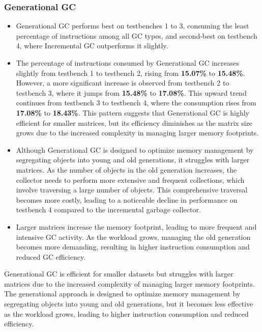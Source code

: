 \documentclass[10pt]{article}
\begin{document}
\subsubsection{Generational GC}
\begin{itemize}
  \item Generational GC performs best on testbenches 1 to 3, consuming the least percentage of instructions among all GC types, and second-best on testbench 4, where Incremental GC outperforms it slightly.
  
  \item The percentage of instructions consumed by Generational GC increases slightly from testbench 1 to testbench 2, rising from \textbf{15.07\%} to \textbf{15.48\%}. However, a more significant increase is observed from testbench 2 to testbench 3, where it jumps from \textbf{15.48\%} to \textbf{17.08\%}. This upward trend continues from testbench 3 to testbench 4, where the consumption rises from \textbf{17.08\%} to \textbf{18.43\%}. This pattern suggests that Generational GC is highly efficient for smaller matrices, but its efficiency diminishes as the matrix size grows due to the increased complexity in managing larger memory footprints.

  \item Although Generational GC is designed to optimize memory management by segregating objects into young and old generations, it struggles with larger matrices. As the number of objects in the old generation increases, the collector needs to perform more extensive and frequent collections, which involve traversing a large number of objects. This comprehensive traversal becomes more costly, leading to a noticeable decline in performance on testbench 4 compared to the incremental garbage collector.

  \item Larger matrices increase the memory footprint, leading to more frequent and intensive GC activity. As the workload grows, managing the old generation becomes more demanding, resulting in higher instruction consumption and reduced GC efficiency.
\end{itemize}
Generational GC is efficient for smaller datasets but struggles with larger matrices due to the increased complexity of managing larger memory footprints. The generational approach is designed to optimize memory management by segregating objects into young and old generations, but it becomes less effective as the workload grows, leading to higher instruction consumption and reduced efficiency.
\end{document}

